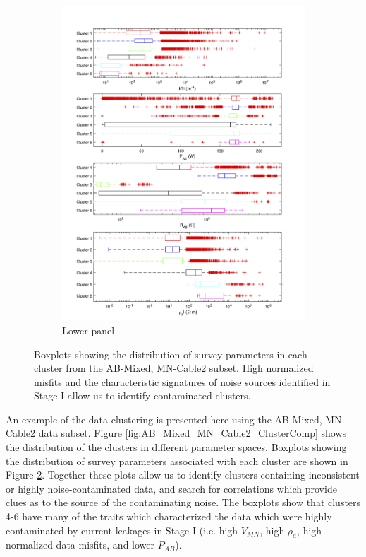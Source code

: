 \documentclass[final,authoryear,5p,times,twocolumn]{elsarticle}
\begin{document}
\begin{figure}[!ht]
   \begin{subfigure}[b]{0.86\linewidth}
       \centering
       \includegraphics[trim=1cm 0.5cm 2cm 2cm, clip=true, width=\linewidth]{./Figures/Fig13b.png}
       \caption{Lower panel}
       \label{fig:AB_Mixed_MN_Cable2_Cluster_PropBoxPlot2}
   \end{subfigure}

   \caption{Boxplots showing the distribution of survey parameters in each cluster from the AB-Mixed, MN-Cable2 subset. High normalized misfits and the characteristic signatures of noise sources identified in Stage I allow us to identify contaminated clusters.}
   \label{fig:AB_Mixed_MN_Cable2_Cluster_PropBoxPlots}
\end{figure}


An example of the data clustering is presented here using the AB-Mixed, MN-Cable2 data subset. Figure \ref{fig:AB_Mixed_MN_Cable2_ClusterComp} shows the distribution of the clusters in different parameter spaces. Boxplots showing the distribution of survey parameters associated with each cluster are shown in Figure \ref{fig:AB_Mixed_MN_Cable2_Cluster_PropBoxPlots}. Together these plots allow us to identify clusters containing inconsistent or highly noise-contaminated data, and search for correlations which provide clues as to the source of the contaminating noise. The boxplots show that clusters 4-6 have many of the traits which characterized the data which were highly contaminated by current leakages in Stage I (i.e. high $V_{MN}$, high $\rho_a$, high normalized data misfits, and lower $P_{AB}$).
\end{document}

